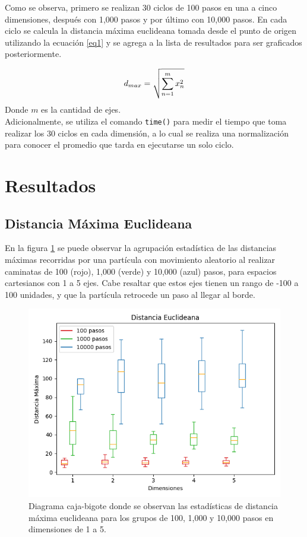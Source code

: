 \documentclass{article}
\begin{document}
Como se observa, primero se realizan 30 ciclos de 100 pasos en una a cinco dimensiones, despu\'es con 1,000 pasos y por \'ultimo con 10,000 pasos. En cada ciclo se calcula la distancia m\'axima euclideana tomada desde el punto de origen utilizando la ecuaci\'on \eqref{eq1} y se agrega a la lista de resultados para ser graficados posteriormente.

\newpage

\begin{equation}
    d_{max} = \sqrt{\sum_{n=1}^m x_{n}^{2}}\\ \label{eq1}
\end{equation}
Donde $m$ es la cantidad de ejes.\\

Adicionalmente, se utiliza el comando \texttt{time()} para medir el tiempo que toma realizar los 30 ciclos en cada dimensi\'on, a lo cual se realiza una normalizaci\'on para conocer el promedio que tarda en ejecutarse un solo ciclo.

\section{Resultados}

\subsection{Distancia M\'axima Euclideana}
En la figura \ref{figura1} se puede observar la agrupaci\'on estad\'istica de las distancias m\'aximas recorridas por una part\'icula con movimiento aleatorio al realizar caminatas de 100 (rojo), 1,000 (verde) y 10,000 (azul) pasos, para espacios cartesianos con 1 a 5 ejes. Cabe resaltar que estos ejes tienen un rango de -100 a 100 unidades, y que la part\'icula retrocede un paso al llegar al borde.

\begin{figure}[h]
    \centering
    \includegraphics[width=150mm]{DistanciaEucl.png}
    \caption{Diagrama caja-bigote donde se observan las estad\'isticas de distancia m\'axima euclideana para los grupos de 100, 1,000 y 10,000 pasos en dimensiones de 1 a 5.}
    \label{figura1}
\end{figure}
\end{document}
